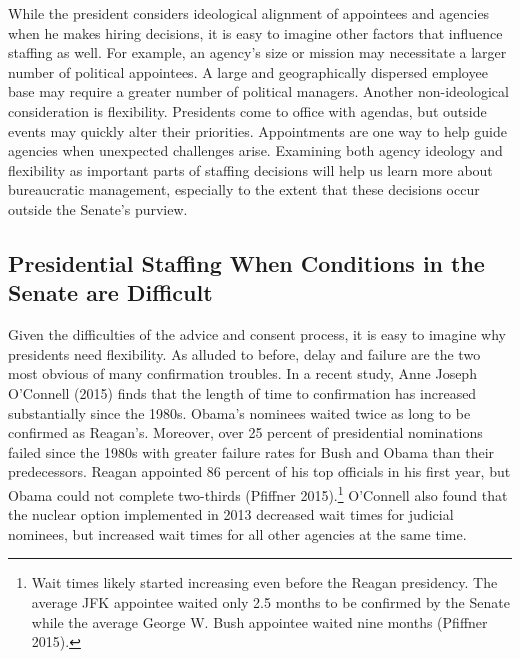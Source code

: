 \documentclass[12pt]{article}
\begin{document}
	
While the president considers ideological alignment of appointees and agencies when he makes hiring decisions, it is easy to imagine other factors that influence staffing as well. For example, an agency's size or mission may necessitate a larger number of political appointees. A large and geographically dispersed employee base may require a greater number of political managers. Another non-ideological consideration is flexibility. Presidents come to office with agendas, but outside events may quickly alter their priorities. Appointments are one way to help guide agencies when unexpected challenges arise. Examining both agency ideology and flexibility as important parts of staffing decisions will help us learn more about bureaucratic management, especially to the extent that these decisions occur outside the Senate's purview. 
	
\subsection*{Presidential Staffing When Conditions in the Senate are Difficult}

Given the difficulties of the advice and consent process, it is easy to imagine why presidents need flexibility. As alluded to before, delay and failure are the two most obvious of many confirmation troubles. In a recent study, Anne Joseph O'Connell (2015) finds that the length of time to confirmation has increased substantially since the 1980s. Obama's nominees waited twice as long to be confirmed as Reagan's. Moreover, over 25 percent of presidential nominations failed since the 1980s with greater failure rates for Bush and Obama than their predecessors. Reagan appointed 86 percent of his top officials in his first year, but Obama could not complete two-thirds (Pfiffner 2015).\footnote{Wait times likely started increasing even before the Reagan presidency. The average JFK appointee waited only 2.5 months to be confirmed by the Senate while the average George W. Bush appointee waited nine months (Pfiffner 2015).} O'Connell also found that the nuclear option implemented in 2013 decreased wait times for judicial nominees, but increased wait times for all other agencies at the same time.
\end{document}
